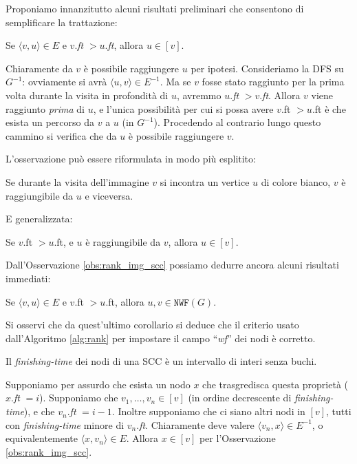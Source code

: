 Proponiamo innanzitutto alcuni risultati preliminari che consentono di semplificare la trattazione:
\begin{observation}
    \label{obs:rank_img_scc}
    Se $\langle v,u\rangle \in E$ e $v$.\emph{ft} $> u$.\emph{ft}, allora $u \in [v]$.
\end{observation}
\begin{proof2}
    Chiaramente da $v$ è possibile raggiungere $u$ per ipotesi. Consideriamo la DFS su $G^{-1}$: ovviamente si avrà $\langle u, v\rangle \in E^{-1}$. Ma se $v$ fosse stato raggiunto per la prima volta durante la visita in profondità di $u$, avremmo $u$.\emph{ft} $> v$.\emph{ft}. Allora $v$ viene raggiunto \emph{prima} di $u$, e l'unica possibilità per cui si possa avere $v$.ft $> u$.ft è che esista un percorso da $v$ a $u$ (in $G^{-1}$). Procedendo al contrario lungo questo cammino si verifica che da $u$ è possibile raggiungere $v$.
\end{proof2}

L'osservazione può essere riformulata in modo più esplitito:
\begin{corollary}
    Se durante la visita dell'immagine $v$ si incontra un vertice $u$ di colore bianco, $v$ è raggiungibile da $u$ e viceversa.
\end{corollary}

E generalizzata:
\begin{corollary}
    \label{cor:scc_minore_inglobamento}
    Se $v$.ft $> u$.ft, e $u$ è raggiungibile da $v$, allora $u \in [v]$.
\end{corollary}

Dall'Osservazione \ref{obs:rank_img_scc} possiamo dedurre ancora alcuni risultati immediati:
\begin{corollary}
    Se $\langle v,u\rangle \in E$ e $v$.ft $> u$.ft, allora $u,v \in \texttt{NWF}(G)$.
\end{corollary}

Si osservi che da quest'ultimo corollario si deduce che il criterio usato dall'Algoritmo \ref{alg:rank} per impostare il campo ``\emph{wf}'' dei nodi è corretto.
\begin{corollary}
    \label{cor:no_buchi_scc}
    Il \emph{finishing-time} dei nodi di una SCC è un intervallo di interi senza buchi.
\end{corollary}
\begin{proof2}
    Supponiamo per assurdo che esista un nodo $x$ che trasgredisca questa proprietà ($x$.\emph{ft} $= i$). Supponiamo che $v_1, \dots, v_n \in [v]$ (in ordine decrescente di \emph{finishing-time}), e che $v_n$.\emph{ft} $= i-1$. Inoltre supponiamo che ci siano altri nodi in $[v]$, tutti con \emph{finishing-time} minore di $v_n$.\emph{ft}. Chiaramente deve valere $\langle v_n,x \rangle \in E^{-1}$, o equivalentemente $\langle x,v_n \rangle \in E$. Allora $x \in [v]$ per l'Osservazione \ref{obs:rank_img_scc}.
\end{proof2}

